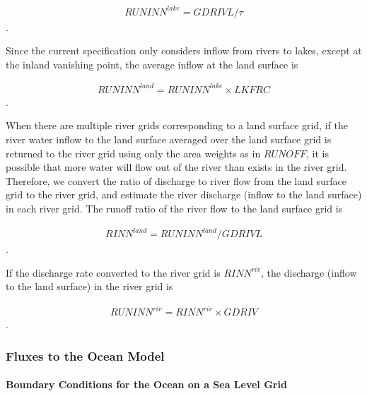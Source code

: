 \begin{eqnarray} RUNINN^{lake}=GDRIVL/\tau \end{eqnarray}.

Since the current specification only considers inflow from rivers to lakes, except at the inland vanishing point, the average inflow at the land surface is

\begin{eqnarray} RUNINN^{land}=RUNINN^{lake} \times LKFRC \end{eqnarray}.

When there are multiple river grids corresponding to a land surface grid, if the river water inflow to the land surface averaged over the land surface grid is returned to the river grid using only the
area weights as in \(RUNOFF\), it is possible that more water will flow out of the river than exists in the river grid. Therefore, we convert the ratio of discharge to river flow from the land surface
grid to the river grid, and estimate the river discharge (inflow to the land surface) in each river grid. The runoff ratio of the river flow to the land surface grid is

\begin{eqnarray} RINN^{land}=RUNINN^{land}/GDRIVL \end{eqnarray}.

If the discharge rate converted to the river grid is \(RINN^{riv}\), the discharge (inflow to the land surface) in the river grid is

\begin{eqnarray} RUNINN^{riv}=RINN^{riv} \times GDRIV \end{eqnarray}.

\hypertarget{fluxes-to-the-ocean-model}{%
\subsubsection{Fluxes to the Ocean Model}\label{fluxes-to-the-ocean-model}}

\hypertarget{boundary-conditions-for-the-ocean-on-a-sea-level-grid}{%
\paragraph{Boundary Conditions for the Ocean on a Sea Level Grid}\label{boundary-conditions-for-the-ocean-on-a-sea-level-grid}}

